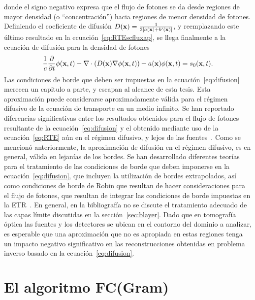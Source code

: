 donde el signo negativo expresa que el flujo de fotones se da desde regiones 
de mayor densidad (o ``concentración'') hacia regiones de menor densidad de fotones. 
Definiendo el coeficiente de difusión $D(\mathbf{x})=\frac{1}{3[a(\mathbf{x})+b'(\mathbf{x})]}$, y reemplazando 
este último resultado en la ecuación~\eqref{eq:RTEscfluxap}, se 
llega finalmente a la ecuación de difusión para la densidad de fotones
\begin{equation}
\frac{1}{c}\frac{\partial}{\partial t} \phi(\mathbf{x},t)-\nabla \cdot \left( D(\mathbf{x}) \nabla  \phi(\mathbf{x},t) \right)
+a(\mathbf{x})\phi(\mathbf{x},t)=s_0(\mathbf{x},t).
\label{eq:difusion}
\end{equation}
Las condiciones de borde que deben ser impuestas en la ecuación~\eqref{eq:difusion} 
merecen un capitulo a parte, y escapan al alcance de esta tesis. 
Esta aproximación puede considerarse aproximadamente válida para el régimen difusivo de la ecuación 
de transporte en un medio infinito. Se han 
reportado diferencias significativas entre los resultados obtenidos para el 
flujo de fotones resultante de la ecuación~\eqref{eq:difusion} y el obtenido 
mediante uso de la ecuación~\eqref{eq:RTE} aún 
en el régimen difusivo, y lejos de las fuentes~\cite{Hielscher1998}. Como se mencionó anteriormente, 
la aproximación de difusión en el régimen difusivo, es en general, válida en lejanías 
de los bordes. Se han desarrollado diferentes teorías para el tratamiento de las 
condiciones de borde que deben imponerse en la ecuación~\eqref{eq:difusion}, 
que incluyen la utilización de bordes extrapolados, así como condiciones de borde de Robin que resultan de hacer consideraciones para el flujo de fotones, que resultan de integrar las condiciones de borde impuestas en la ETR~\cite{Arridge2009,Haskell1994,Ishimaru1978,Arridge1999,Xu2002}. En general, en la bibliografía 
no se discute el tratamiento adecuado de las capas límite discutidas en la sección~\ref{sec:blayer}. Dado que en tomografía óptica las fuentes y los detectores 
se ubican en el contorno del dominio a analizar, es esperable que una aproximación 
que no es apropiada en estas regiones tenga un impacto negativo significativo en las reconstrucciones obtenidas en problema inverso basado en la ecuación~\eqref{eq:difusion}. 
\pagebreak

\chapter{El algoritmo FC(Gram)}
\label{ap:fcgram}

